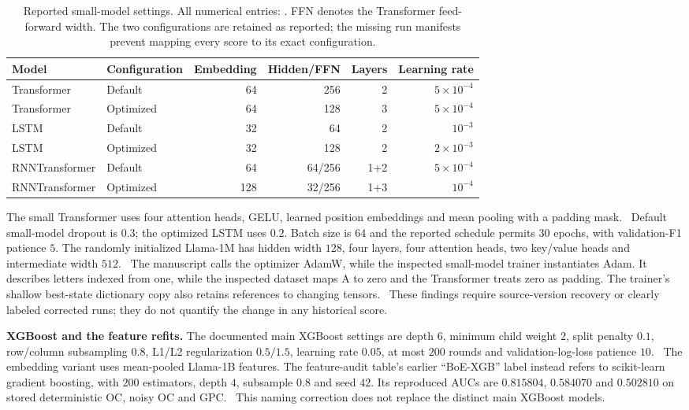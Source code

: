 \begin{table}[H]
\centering\small
\caption{Reported small-model settings. All numerical entries: \ou. FFN denotes the Transformer feed-forward width. The two configurations are retained as reported; the missing run manifests prevent mapping every score to its exact configuration.}
\begin{tabular}{@{}llrrrr@{}}\toprule
Model & Configuration & Embedding & Hidden/FFN & Layers & Learning rate \\\midrule
Transformer & Default & 64 & 256 & 2 & $5\times10^{-4}$ \\
Transformer & Optimized & 64 & 128 & 3 & $5\times10^{-4}$ \\
LSTM & Default & 32 & 64 & 2 & $10^{-3}$ \\
LSTM & Optimized & 32 & 128 & 2 & $2\times10^{-3}$ \\
RNNTransformer & Default & 64 & 64/256 & 1+2 & $5\times10^{-4}$ \\
RNNTransformer & Optimized & 128 & 32/256 & 1+3 & $10^{-4}$ \\
\bottomrule\end{tabular}
\end{table}

The small Transformer uses four attention heads, GELU, learned position embeddings and mean pooling with a padding mask. \ou\ Default small-model dropout is $0.3$; the optimized LSTM uses $0.2$. Batch size is $64$ and the reported schedule permits $30$ epochs, with validation-F1 patience $5$. The randomly initialized Llama-1M has hidden width $128$, four layers, four attention heads, two key/value heads and intermediate width $512$. \ou\ The manuscript calls the optimizer AdamW, while the inspected small-model trainer instantiates Adam. It describes letters indexed from one, while the inspected dataset maps A to zero and the Transformer treats zero as padding. The trainer's shallow best-state dictionary copy also retains references to changing tensors. \newres\ These findings require source-version recovery or clearly labeled corrected runs; they do not quantify the change in any historical score.

\textbf{XGBoost and the feature refits.} The documented main XGBoost settings are depth $6$, minimum child weight $2$, split penalty $0.1$, row/column subsampling $0.8$, L1/L2 regularization $0.5/1.5$, learning rate $0.05$, at most $200$ rounds and validation-log-loss patience $10$. \ou\ The embedding variant uses mean-pooled Llama-1B features. The feature-audit table's earlier ``BoE-XGB'' label instead refers to scikit-learn gradient boosting, with $200$ estimators, depth $4$, subsample $0.8$ and seed $42$. Its reproduced AUCs are $0.815804$, $0.584070$ and $0.502810$ on stored deterministic OC, noisy OC and GPC. \recomp\ This naming correction does not replace the distinct main XGBoost models.

